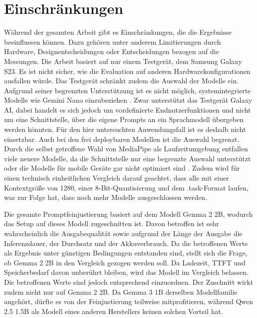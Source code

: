 \section{Einschränkungen}
\label{sec:einschraenkungen}
Während der gesamten Arbeit gibt es Einschränkungen, die die Ergebnisse beeinflussen können. Dazu gehören unter anderem Limitierungen durch Hardware, Designentscheidungen oder Entscheidungen bezogen auf die Messungen.
Die Arbeit basiert auf nur einem Testgerät, dem Samsung Galaxy S23. Es ist nicht sicher, wie die Evaluation auf anderen Hardwarekonfigurationen ausfallen würde. Das Testgerät schränkt zudem die Auswahl der Modelle ein. Aufgrund seiner begrenzten Unterstützung ist es nicht möglich, systemintegrierte Modelle wie Gemini Nano einzubeziehen \autocite{mlkit_genai_devices}. Zwar unterstützt das Testgerät Galaxy AI, dabei handelt es sich jedoch um vordefinierte Endnutzerfunktionen \autocite{samsung_galaxyai} und nicht um eine Schnittstelle, über die eigene Prompts an ein Sprachmodell übergeben werden könnten. Für den hier untersuchten Anwendungsfall ist es deshalb nicht einsetzbar. Auch bei den frei deploybaren Modellen ist die Auswahl begrenzt. Durch die selbst getroffene Wahl von MediaPipe als Laufzeitumgebung entfallen viele neuere Modelle, da die Schnittstelle nur eine begrenzte Auswahl unterstützt \autocite{mediapipe_llm} oder die Modelle für mobile Geräte gar nicht optimiert sind \autocite{edgellm_review}. Zudem wird für einen technisch einheitlichen Vergleich darauf geachtet, dass alle mit einer Kontextgröße von 1280, einer 8-Bit-Quantisierung und dem .task-Format laufen, was zur Folge hat, dass noch mehr Modelle ausgeschlossen werden.
\vspace{\baselineskip}

\noindent Die gesamte Promptfeinjustierung basiert auf dem Modell Gemma 2 2B, wodurch das Setup auf dieses Modell zugeschnitten ist. Davon betroffen ist sehr wahrscheinlich die Ausgabequalität sowie aufgrund der Länge der Ausgabe die Inferenzdauer, der Durchsatz und der Akkuverbrauch. Da die betroffenen Werte als Ergebnis unter günstigen Bedingungen entstanden sind, stellt sich die Frage, ob Gemma 2 2B in den Vergleich gezogen werden soll. Da Ladezeit, \ac{TTFT} und Speicherbedarf davon unberührt bleiben, wird das Modell im Vergleich belassen. Die betroffenen Werte sind jedoch entsprechend einzuordnen. Der Zuschnitt wirkt zudem nicht nur auf Gemma 2 2B. Da Gemma 3 1B derselben Modellfamilie angehört, dürfte es von der Feinjustierung teilweise mitprofitieren, während Qwen 2.5 1.5B als Modell eines anderen Herstellers keinen solchen Vorteil hat.\vspace{\baselineskip}


